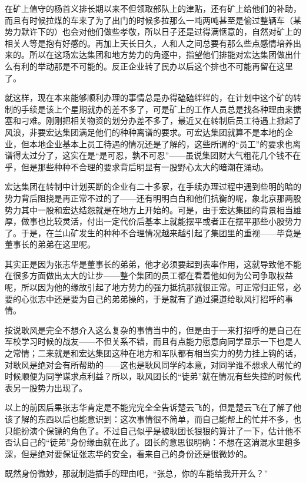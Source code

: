 在矿上值守的杨首义排长期以来不但领取部队上的津贴，还有矿上给他们的补助，而且有时候拉煤的车来了为了出门的时候多拉那么一吨两吨甚至是偷过整辆车（某势力默许下的）也会对他们做些孝敬，所以日子还是过得满惬意的，自然对矿上的相关人等是抱有好感的。再加上天长日久，人和人之间总要有那么些点感情培养出来的。所以在这场宏达集团和地方势力的角逐中，指望他们排能对宏达集团做出什么有利的举动那是不可能的。反正企业转了民办以后这个排也不可能再留在这里了。

就这样，现在本来能够顺利办理的事情总是办得磕磕绊绊的，在计划中这个矿的转制的手续是该上个星期就办的差不多了，可是矿上的工作人员总是找各种理由来搪塞和刁难。刚刚把相关物资的划分办差不多了，最近又在转制后员工待遇上掀起了风浪，非要宏达集团满足他们的种种离谱的要求。可宏达集团就算不是本地的企业，但本地企业基本上员工待遇的情况还是了解的，这些所谓的“员工”的要求也离谱得太过分了，这实在是“是可忍，孰不可忍”——虽说集团财大气粗花几个钱不在乎，但是那些种种不合理的要求背后明显有一股野心太大的暗潮在涌动。

宏达集团在转制中计划买断的企业有二十多家，在手续办理过程中遇到些明的暗的势力背后阻挠是再正常不过的了——还有明明白白和他们抗衡的呢，象北京那两股势力其中一股和宏达结怨就是在地方上开始的。可是，由于宏达集团的背景相当雄厚，做事也比较灵活，付出一定代价后基本上就能摆平或者正在摆平那些小股势力了。于是，在兰山矿发生的种种不合理情况越来越引起了集团里的重视——毕竟是董事长的弟弟在这里呢。

其实正是因为张志华是董事长的弟弟，他才必须要起到表率作用，这就导致他不能在很多方面做出太大的让步——整个集团的员工都在看着他如何为公司争取权益呢，所以因为他的缘故引起了地方势力的强力抵抗那就很正常。可正常归正常，必要的心张志中还是要为自己的弟弟操的，于是就有了通过渠道给耿风打招呼的事情。

按说耿风是完全不想介入这么复杂的事情当中的，但是由于一来打招呼的是自己在军校学习时候的战友——不但关系不错，而且有点能力愿意向同学显示一下也是人之常情；二来就是和宏达集团这种在地方和军队都有相当实力的势力挂上钩的话，对耿风是绝对会有所帮助的——这也是耿风同学的本意，对同学谁不想求人帮忙的时候顺便为同学谋求点利益？所以，耿风团长的“徒弟”就在情况有些失控的时候代表另一股势力出现了。

以上的前因后果张志华肯定是不能完完全全告诉楚云飞的，但是楚云飞在了解了他该了解的东西以后也能意识到：这次事情很不简单，而自己能帮上的忙并不多，也只能扮演个保镖的角色了。不过自己似乎是被耿团长狠狠的算计了一下，估计他不否认自己的“徒弟”身份缘由就在此了。团长的意思很明确：不想在这淌混水里趟多深，但是绝对要保证张志华的安全，看来自己的身份还是很微妙的。

既然身份微妙，那就制造插手的理由吧，“张总，你的车能给我开开么？”

